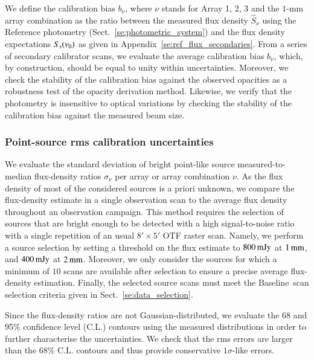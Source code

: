 \documentclass[traditionalabstract]{aa}
\newcommand{\baseline}{Baseline}%
\newcommand{\lp}[1]{#1}
\newcommand{\rev}[1]{#1}
\begin{document}
{We define the calibration bias
$b_{\nu}$, where $\nu$ stands for Array 1, 2, 3 and the
$1$-mm array combination as
the ratio between the measured flux density $\hat{S}_{\nu}$ using the
Reference photometry
(Sect.~\ref{se:photometric_system}) and the flux density
expectations $S_{\rm{s}}(\nu_0)$ as given in
Appendix~\ref{se:ref_flux_secondaries}. From a series of
secondary calibrator scans, we evaluate the average calibration bias
$b_{\nu}$, which, by construction, should be equal to
unity within uncertainties.
Moreover, we check the stability of the calibration bias against
the observed opacities as a robustness test of the
opacity derivation method. Likewise, we verify that the photometry is
insensitive to optical variations by checking the stability of the
calibration bias against the measured beam size.

\subsubsection{{\rev Point-source} rms calibration uncertainties}
\label{se:def_calibration_rms_error}
We evaluate the standard deviation of bright {\rev point-like} source
measured-to-median flux-density ratios $\sigma_{\nu}$ per array or array combination $\nu$.
As the flux density of most of the considered sources is a priori unknown, we
compare the flux-density estimate in a single observation scan to the
average flux density throughout an observation campaign. This method
requires the selection of sources that are bright enough to be
detected with a high signal-to-noise ratio with a single repetition of an usual
$8'\times 5'$ OTF raster scan. Namely, we perform a source
selection by setting a threshold on the flux estimate to $800\,\rm{mJy}$ at
$1\,\rm{mm}$, and $400\,\rm{mJy}$ at $2\,\rm{mm}$. Moreover, we only consider the sources for which a minimum of $10$ scans are available after
selection to ensure a precise average flux-density
estimation. Finally, the selected source scans must meet the \baseline\
scan selection criteria given in Sect.~\ref{se:data_selection}.

{\lp Since the flux-density ratios are not Gaussian-distributed, we
evaluate the 68 and 95\% confidence level (C.L.) contours using the
measured distributions in order to further characterise the
uncertainties. We check that the rms
errors are larger than the 68\% C.L. contours and thus provide
conservative $1\sigma$-like errors.}    

}
\end{document}
